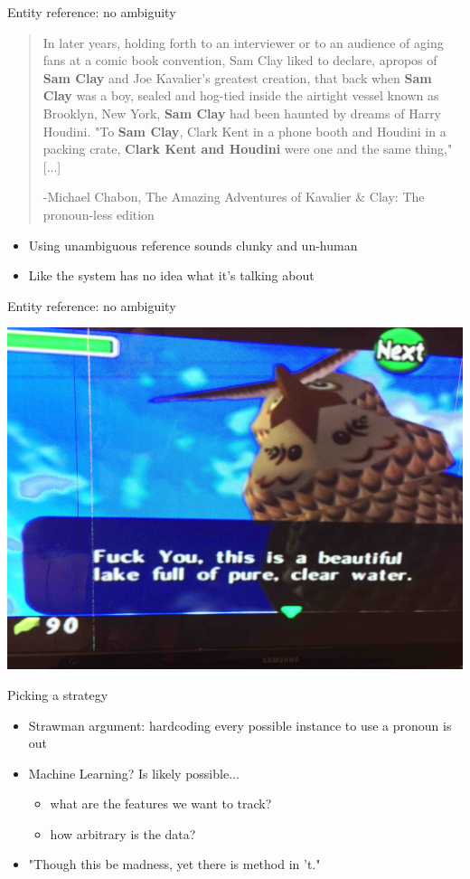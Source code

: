 \documentclass[10pt, compress]{beamer}
\begin{document}
\begin{frame}{Entity reference: no ambiguity}
	\begin{quote}
		In later years, holding forth to an interviewer or to an audience of aging fans at a comic book convention, Sam Clay liked to declare, apropos of \textbf{Sam Clay} and Joe Kavalier's greatest creation, that back when \textbf{Sam Clay} was a boy, sealed and hog-tied inside the airtight vessel known as Brooklyn, New York, \textbf{Sam Clay} had been haunted by dreams of Harry Houdini. "To \textbf{Sam Clay}, Clark Kent in a phone booth and Houdini in a packing crate, \textbf{Clark Kent and Houdini} were one and the same thing,"[...]

		\medskip
		-Michael Chabon, The Amazing Adventures of Kavalier \& Clay: The pronoun-less edition
	\end{quote}

	\begin{itemize}
		\item Using unambiguous reference sounds clunky and un-human \pause
		\item Like the system has no idea what it's talking about
	\end{itemize}
\end{frame}

\begin{frame}{Entity reference: no ambiguity}
	\begin{center}
		\includegraphics[width=.8\textwidth]{images/zelda.jpg}
	\end{center}
\end{frame}

\begin{frame}{Picking a strategy}
	\begin{itemize}
		\item Strawman argument: hardcoding every possible instance to use a pronoun is out 	\pause
		\item Machine Learning? \pause Is likely possible...	\pause
		\begin{itemize}
			\item what are the features we want to track?
			\item how arbitrary is the data?
		\end{itemize}
		\pause
		\item "Though this be madness, yet there is method in 't."
	\end{itemize}
\end{frame}
\end{document}
